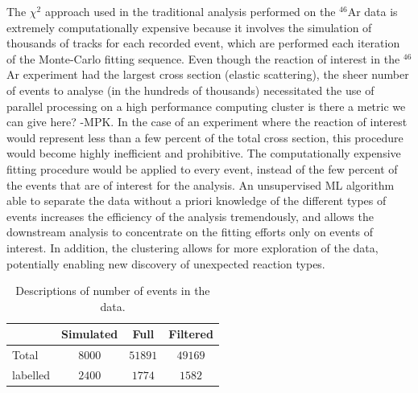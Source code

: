 \documentclass[review,number,sort&compress]{elsarticle}
\begin{document}
The $\chi^2$ approach used in the traditional analysis performed on the $^{46}$Ar data is extremely computationally expensive because it involves the simulation of thousands of tracks for each recorded event, which are performed each iteration of the Monte-Carlo fitting sequence. Even though the reaction of interest in the $^{46}$Ar experiment had the largest cross section (elastic scattering), the sheer number of events to analyse (in the hundreds of thousands) necessitated the use of parallel processing on a high performance computing cluster {\color{blue} is there a metric we can give here? -MPK}. In the case of an experiment where the reaction of interest would represent less than a few percent of the total cross section, this procedure would become highly inefficient and prohibitive. 
The computationally expensive fitting procedure would be applied to every event, instead of the few percent of the events that are of interest for the analysis.
An unsupervised ML algorithm able to separate the data without a priori knowledge of the different types of events increases the efficiency of the analysis tremendously, and allows the downstream analysis to concentrate on the fitting efforts only on events of interest. In addition, the clustering allows for more exploration of the data, potentially enabling new discovery of unexpected reaction types.




\begin{table}[hbtp]
\centering
\caption{Descriptions of number of events in the data.}\label{tab:datasets}
\begin{tabular}{lccc}
\toprule
{} & Simulated & Full & Filtered \\
\midrule
Total &  $8000$ & $51891$ & $49169$ \\
labelled & $2400$ & $1774$ &  $1582$ \\ 
\bottomrule
\end{tabular}
\end{table}
\end{document}
